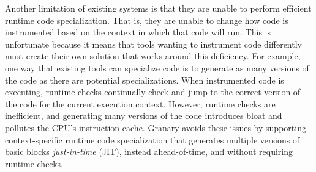 \documentclass[preprint]{sigplanconf}
\begin{document}


Another limitation of existing systems is that they are unable to perform efficient runtime code specialization. That is, they are unable to change how code is instrumented based on the context in which that code will run. This is unfortunate because it means that tools wanting to instrument code differently must create their own solution that works around this deficiency. For example, one way that existing tools can specialize code is to generate as many versions of the code as there are potential specializations. When instrumented code is executing, runtime checks continually check and jump to the correct version of the code for the current execution context. However, runtime checks are inefficient, and generating many versions of the code introduces bloat and pollutes the CPU's instruction cache. Granary avoids these issues by supporting context-specific runtime code specialization that generates multiple versions of basic blocks \emph{just-in-time} (JIT), instead ahead-of-time, and without requiring runtime checks.

\end{document}
